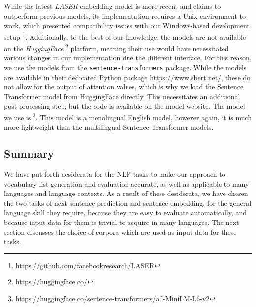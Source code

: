 While the latest \textit{LASER} embedding model is more recent and claims to outperform previous models, its implementation requires a Unix environment to work, which presented compatibility issues with our Windows-based development setup \footnote{\url{https://github.com/facebookresearch/LASER}}.
Additionally, to the best of our knowledge, the models are not available on the \textit{HuggingFace} \footnote{\url{https://huggingface.co/}} platform, meaning their use would have necessitated various changes in our implementation due the different interface.
For this reason, we use the models from the \texttt{sentence-transformers} package.
While the models are available in their dedicated Python package \url{https://www.sbert.net/}, these do not allow for the output of attention values, which is why we load the Sentence Transformer model from HuggingFace directly.
This necessitates an additional post-processing step, but the code is available on the model website.
The model we use is \footnote{\url{https://huggingface.co/sentence-transformers/all-MiniLM-L6-v2}}.
This model is a monolingual English model, however again, it is much more lightweight than the multilingual Sentence Transformer models.



\subsection{Summary}
We have put forth desiderata for the NLP tasks to make our approach to vocabulary list generation and evaluation accurate, as well as applicable to many languages and language contexts.
As a result of these desiderata, we have chosen the two tasks of next sentence prediction and sentence embedding, for the general language skill they require, because they are easy to evaluate automatically, and because input data for them is trivial to acquire in many languages.
The next section discusses the choice of corpora which are used as input data for these tasks.


